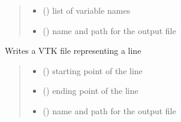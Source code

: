 \documentclass[letterpaper,10pt,english]{sphinxmanual}
\begin{document}
\begin{fulllineitems}
\begin{quote}
\begin{description}
\begin{itemize}
\item {} 
\sphinxAtStartPar
{} () \textendash{} list of variable names

\item {} 
\sphinxAtStartPar
{} () \textendash{} name and path for the output file

\end{itemize}

\end{description}\end{quote}

\end{fulllineitems}


\begin{fulllineitems}
\label{\detokenize{reference:VTK.VTKline}}
\pysigstartsignatures
{}
\pysigstopsignatures
\sphinxAtStartPar
Writes a VTK file representing a line
\begin{quote}\begin{description}
\begin{itemize}
\item {} 
\sphinxAtStartPar
{} () \textendash{} starting point \sphinxcode{\sphinxupquote{{[}x, y, z{]}}} of the line

\item {} 
\sphinxAtStartPar
{} () \textendash{} ending point \sphinxcode{\sphinxupquote{{[}x, y, z{]}}} of the line

\item {} 
\sphinxAtStartPar
{} () \textendash{} name and path for the output file

\end{itemize}

\end{description}\end{quote}

\end{fulllineitems}
\end{document}
